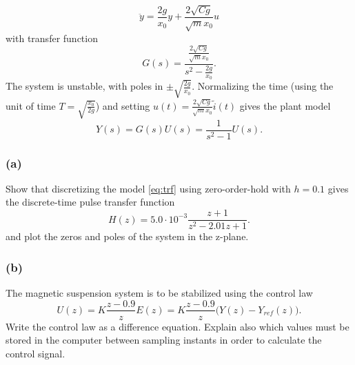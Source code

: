 \documentclass[letterpaper,12pt]{article}
\newcommand{\bmpl}{\begin{minipage}[t]{\textwidth}}
\newcommand{\emp}{\end{minipage}}
\begin{document}
\begin{equation}
\ddot{y} = \frac{2g}{x_0} y + \frac{2 \sqrt{Cg}}{\sqrt{m} x_0} u
\label{eq:ode}
\end{equation}
with transfer function
\begin{equation}
G(s) = \frac{ \frac{ 2\sqrt{Cg} }{\sqrt{m} x_0} }{s^2 - \frac{2g}{x_0}}.
\end{equation}
The system is unstable, with poles in \(\pm \sqrt{\frac{2g}{x_0}}\). Normalizing the time (using the unit of time \(T=\sqrt{\frac{x_0}{2g}}\)) and setting $u(t) = \frac{2\sqrt{Cg}}{\sqrt{m}x_0} \tilde{i}(t)$ gives the plant model
\begin{equation}
Y(s) = G(s)U(s) = \frac{1}{s^2 - 1} U(s).
\label{eq:trf}
\end{equation}

\subsubsection*{(a)}
Show that discretizing the model \eqref{eq:trf} using zero-order-hold with $h=0.1$ gives the discrete-time pulse transfer function
\begin{equation}
H(z) = 5.0\cdot 10^{-3} \frac{z+1}{z^2 - 2.01z +1}.
\end{equation}
and plot the zeros and poles of the system in the z-plane.
 
\noindent
\fbox{
   \bmpl
   {\bf Solution:}\\
   \vspace*{135mm}
   \emp}
 
\subsubsection*{(b)}
The magnetic suspension system is to be stabilized using the control law
\begin{equation}
 U(z) = K \frac{z - 0.9}{z} E(z) = K \frac{z - 0.9}{z}  \big(Y(z) - Y_{ref}(z)\big). 
\label{eq:controllaw}
\end{equation}
Write the control law as a difference equation. Explain also which values must be stored in the computer between sampling instants in order to calculate the control signal.
 
\noindent
\fbox{
   \bmpl
   {\bf Solution:}\\[3mm]

   \vspace*{115mm}

   \( u(k+1) = \)\\[3mm]
   \emp}
 
\end{document}
